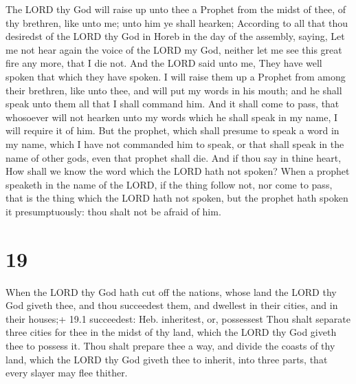  The LORD thy God will raise up unto thee a Prophet from
the midst of thee, of thy brethren, like unto me; unto him ye shall
hearken;  According to all that thou desiredst of the LORD
thy God in Horeb in the day of the assembly, saying, Let me not hear
again the voice of the LORD my God, neither let me see this great fire
any more, that I die not.  And the LORD said unto me, They
have well spoken that which they have spoken.  I will raise
them up a Prophet from among their brethren, like unto thee, and will
put my words in his mouth; and he shall speak unto them all that I shall
command him.  And it shall come to pass, that whosoever
will not hearken unto my words which he shall speak in my name, I will
require it of him.  But the prophet, which shall presume to
speak a word in my name, which I have not commanded him to speak, or
that shall speak in the name of other gods, even that prophet shall die.
 And if thou say in thine heart, How shall we know the word
which the LORD hath not spoken?  When a prophet speaketh in
the name of the LORD, if the thing follow not, nor come to pass, that is
the thing which the LORD hath not spoken, but the prophet hath spoken it
presumptuously: thou shalt not be afraid of him.

\hypertarget{section-18}{%
\section{19}\label{section-18}}

 When the LORD thy God hath cut off the nations, whose land
the LORD thy God giveth thee, and thou succeedest them, and dwellest in
their cities, and in their houses;+ 19.1 succeedest: Heb. inheritest,
or, possessest  Thou shalt separate three cities for thee in
the midst of thy land, which the LORD thy God giveth thee to possess it.
 Thou shalt prepare thee a way, and divide the coasts of thy
land, which the LORD thy God giveth thee to inherit, into three parts,
that every slayer may flee thither.

